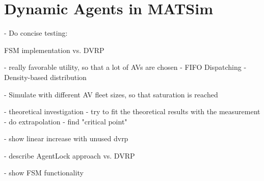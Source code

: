 \chapter{Dynamic Agents in MATSim}
\label{sec:dynagent}


- Do concise testing:

  FSM implementation vs. DVRP

  - really favorable utility, so that a lot of AVs are chosen
  - FIFO Dispatching
  - Density-based distribution

  - Simulate with different AV fleet sizes, so that saturation is reached

  - theoretical investigation
    - try to fit the theoretical results with the measurement
    - do extrapolation
    - find "critical point"

  - show linear increase with unused dvrp



  - describe AgentLock approach vs. DVRP

  - show FSM functionality
